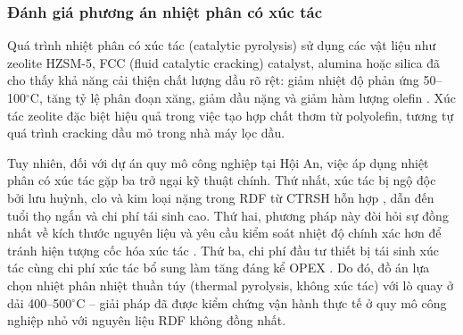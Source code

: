 \documentclass[../main.tex]{subfiles}
\begin{document}
\begin{table}[htbp]
\centering
\caption{Đặc tính điển hình của dầu nhiệt phân từ rác nhựa theo tài liệu nghiên cứu}
\label{tab:dac-tinh-dau-nhiet-phan}
\setlength{\tabcolsep}{5pt}
\end{table}

\subsubsection{Đánh giá phương án nhiệt phân có xúc tác}
\label{sec:xuc-tac-nhiet-phan}

Quá trình nhiệt phân có xúc tác (catalytic pyrolysis) sử dụng các vật liệu như zeolite HZSM-5, FCC (fluid catalytic cracking) catalyst, alumina hoặc silica đã cho thấy khả năng cải thiện chất lượng dầu rõ rệt: giảm nhiệt độ phản ứng 50--100$^\circ\mathrm{C}$, tăng tỷ lệ phân đoạn xăng, giảm dầu nặng và giảm hàm lượng olefin \cite{lopez2017recent}. Xúc tác zeolite đặc biệt hiệu quả trong việc tạo hợp chất thơm từ polyolefin, tương tự quá trình cracking dầu mỏ trong nhà máy lọc dầu.

Tuy nhiên, đối với dự án quy mô công nghiệp tại Hội An, việc áp dụng nhiệt phân có xúc tác gặp ba trở ngại kỹ thuật chính. Thứ nhất, xúc tác bị ngộ độc bởi lưu huỳnh, clo và kim loại nặng trong RDF từ CTRSH hỗn hợp \cite{quyen2025giaotrinh}, dẫn đến tuổi thọ ngắn và chi phí tái sinh cao. Thứ hai, phương pháp này đòi hỏi sự đồng nhất về kích thước nguyên liệu và yêu cầu kiểm soát nhiệt độ chính xác hơn để tránh hiện tượng cốc hóa xúc tác \cite{quyen2025giaotrinh}. Thứ ba, chi phí đầu tư thiết bị tái sinh xúc tác cùng chi phí xúc tác bổ sung làm tăng đáng kể OPEX \cite{Miandad2016}. Do đó, đồ án lựa chọn nhiệt phân nhiệt thuần túy (thermal pyrolysis, không xúc tác) với lò quay ở dải 400--500$^\circ\mathrm{C}$ -- giải pháp đã được kiểm chứng vận hành thực tế ở quy mô công nghiệp nhỏ với nguyên liệu RDF không đồng nhất.
\end{document}
